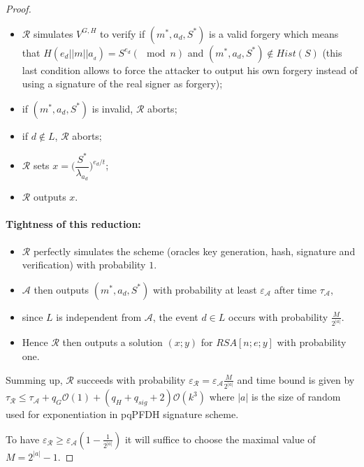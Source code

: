 \documentclass[a4paper,11pt]{article}
\begin{document}
\begin{proof}
 \begin{itemize}
    \item $\mathcal{R}$ simulates $V^{G,H}$ to verify if $(m^{*}, a_{d} , S^{*} )$ is a valid forgery which means that  $H(e_{d}||m||a_{_{d}}) = S^{e_{d}} (\mod n)$ and  $(m^{*}, a_{d}, S^{*} ) \notin  Hist(S)$ (this last condition allows to force  the attacker to output his own forgery instead of using a signature of the real signer as forgery);
    \item if $(m^{*}, a_{d} , S^{*} )$ is invalid, $\mathcal{R}$ aborts;
    \item if $d \notin L$, $\mathcal{R}$ aborts;
    \item $\mathcal{R}$ sets $ x = \big(\dfrac{S^{*}}{\lambda_{a_{d}}}\big)^{e_{d}/t}$;
    \item $\mathcal{R}$ outputs $x$.
\end{itemize}

\paragraph{Tightness of this reduction:}
\begin{itemize}
 \item  $\mathcal{R}$ perfectly simulates the scheme (oracles key generation,  hash, signature and verification) with probability $1$.
 \item $\mathcal{A}$ then outputs  $(m^{*}, a_{d}, S^{*}) $ with probability at least  $\varepsilon_{\mathcal{A}}$ after time $\tau_{\mathcal{A}}$,
 \item  since $L$ is independent from $\mathcal{A}$, the event $d \in L $ occurs with probability $\frac{M}{2^{|a|}}$.
 \item Hence $\mathcal{R}$ then outputs a solution $(x; y)$ for $RSA[n; e; y]$ with probability one.
\end{itemize}

Summing up, $\mathcal{R}$ succeeds with probability $\varepsilon_{\mathcal{R}} = \varepsilon_{\mathcal{A}}\frac{M}{2^{|a|}}$ and time bound is given by $\tau_{\mathcal{R}}\leq \tau_{\mathcal{A}} + q_{G}\mathcal{O}(1) + (q_{H}+ q_{sig}+2)\mathcal{O}(k^{3})$ where $|a|$ is the size of random  used for exponentiation in pqPFDH signature scheme.

To have $\varepsilon_{\mathcal{R}} \geq \varepsilon_{\mathcal{A}}(1-\frac{1}{2^{|a|}}) $ it will suffice to choose the maximal value of $M=2^{|a|}-1$.

\end{proof}
\end{document}
